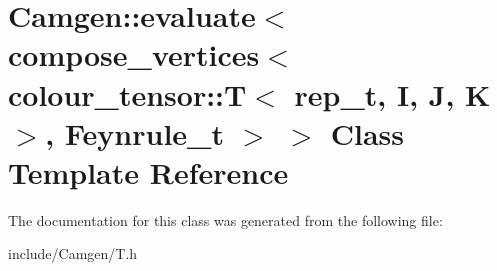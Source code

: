 \hypertarget{a00172}{\section{Camgen\-:\-:evaluate$<$ compose\-\_\-vertices$<$ colour\-\_\-tensor\-:\-:T$<$ rep\-\_\-t, I, J, K $>$, Feynrule\-\_\-t $>$ $>$ Class Template Reference}
\label{a00172}
}


The documentation for this class was generated from the following file\-:\begin{DoxyCompactItemize}
\item 
include/\-Camgen/T.\-h\end{DoxyCompactItemize}
